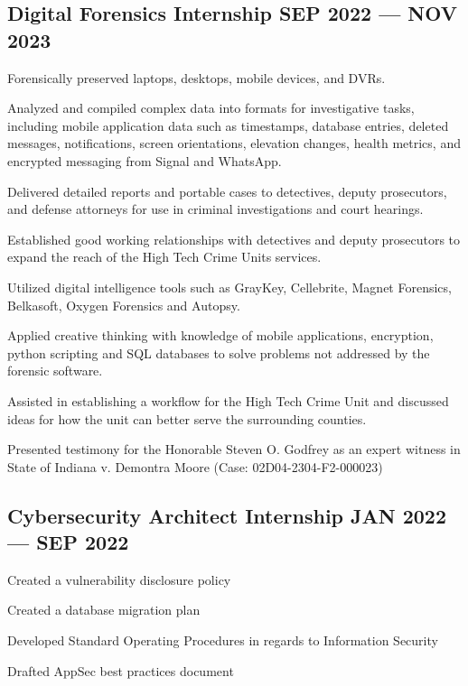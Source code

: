 \documentclass[letter,10pt]{article}
\begin{document}
\subsection{Digital Forensics Internship \hfill SEP 2022 --- NOV 2023}
\begin{zitemize} 
\item Forensically preserved laptops, desktops, mobile devices, and DVRs.
\item Analyzed and compiled complex data into formats for investigative tasks, including mobile application data such as timestamps, database entries, deleted messages, notifications, screen orientations, elevation changes, health metrics, and encrypted messaging from Signal and WhatsApp.
\item Delivered detailed reports and portable cases to detectives, deputy prosecutors, and defense attorneys for use in criminal investigations and court hearings.
\item Established good working relationships with detectives and deputy prosecutors to expand the reach of the High Tech Crime Units services.
\item Utilized digital intelligence tools such as GrayKey, Cellebrite, Magnet Forensics, Belkasoft, Oxygen Forensics and Autopsy. 
\item Applied creative thinking with knowledge of mobile applications, encryption, python scripting and SQL databases to solve problems not addressed by the forensic software.
\item Assisted in establishing a workflow for the High Tech Crime Unit and discussed ideas for how the unit can better serve the surrounding counties. 
\item Presented testimony for the Honorable Steven O. Godfrey as an expert witness in State of Indiana v. Demontra Moore (Case: 02D04-2304-F2-000023)
\end{zitemize}

\newpage
\vspace*{-\baselineskip}
\thispagestyle{empty}
\vspace{-60px}

\subsection{Cybersecurity Architect Internship \hfill JAN 2022 --- SEP 2022}
\begin{zitemize}
\item Created a vulnerability disclosure policy
\item Created a database migration plan
\item Developed Standard Operating Procedures in regards to Information Security
\item Drafted AppSec best practices document
\end{zitemize}
\end{document}
